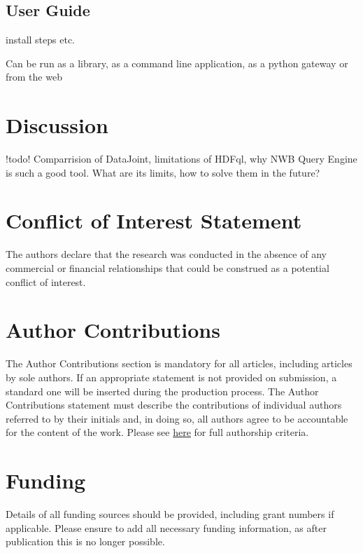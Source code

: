\documentclass[utf8]{frontiersSCNS} %
\begin{document}
\subsection{User Guide}
install steps etc.

Can be run as a library, as a command line application, as a python gateway or from the web

\section{Discussion}
\label{Discussion}

!todo! Comparrision of DataJoint, limitations of HDFql, why NWB Query Engine is such a good tool. What are its limits, how to solve them in the future?



\section*{Conflict of Interest Statement}

The authors declare that the research was conducted in the absence of any commercial or financial relationships that could be construed as a potential conflict of interest.

\section*{Author Contributions}

The Author Contributions section is mandatory for all articles, including articles by sole authors. If an appropriate statement is not provided on submission, a standard one will be inserted during the production process. The Author Contributions statement must describe the contributions of individual authors referred to by their initials and, in doing so, all authors agree to be accountable for the content of the work. Please see  \href{http://home.frontiersin.org/about/author-guidelines#AuthorandContributors}{here} for full authorship criteria.

\section*{Funding}
Details of all funding sources should be provided, including grant numbers if applicable. Please ensure to add all necessary funding information, as after publication this is no longer possible.
\end{document}
